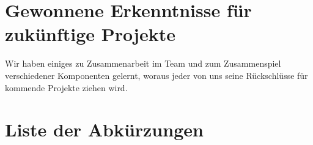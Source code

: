 \documentclass[a4paper,11pt,DIV=12]{scrreprt}%
\begin{document}
\chapter{Gewonnene Erkenntnisse für zukünftige Projekte}
Wir haben einiges zu Zusammenarbeit im Team und zum Zusammenspiel verschiedener Komponenten gelernt, woraus jeder von uns seine Rückschlüsse für kommende Projekte ziehen wird.


\chapter*{Liste der Abkürzungen}
\begin{acronym}
\end{acronym}

\listoffigures
\lstlistoflistings
\end{document}
